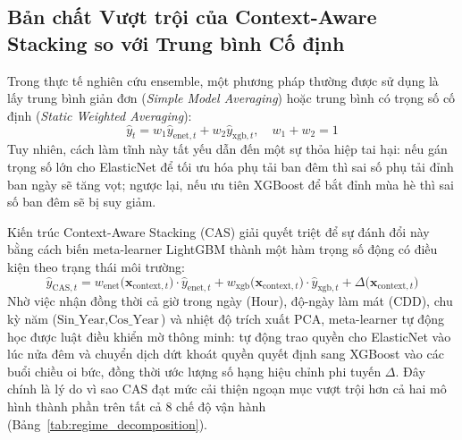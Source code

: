 \subsection{Bản chất Vượt trội của Context-Aware Stacking so với Trung bình Cố định}
Trong thực tế nghiên cứu ensemble, một phương pháp thường được sử dụng là lấy trung bình giản đơn (\textit{Simple Model Averaging}) hoặc trung bình có trọng số cố định (\textit{Static Weighted Averaging}):
\begin{equation}
    \hat{y}_t = w_1 \hat{y}_{\text{enet}, t} + w_2 \hat{y}_{\text{xgb}, t}, \quad w_1 + w_2 = 1
\end{equation}
Tuy nhiên, cách làm tĩnh này tất yếu dẫn đến một sự thỏa hiệp tai hại: nếu gán trọng số lớn cho ElasticNet để tối ưu hóa phụ tải ban đêm thì sai số phụ tải đỉnh ban ngày sẽ tăng vọt; ngược lại, nếu ưu tiên XGBoost để bắt đỉnh mùa hè thì sai số ban đêm sẽ bị suy giảm.

Kiến trúc Context-Aware Stacking (CAS) giải quyết triệt để sự đánh đổi này bằng cách biến meta-learner LightGBM thành một hàm trọng số động có điều kiện theo trạng thái môi trường:
\begin{equation}
    \hat{y}_{\text{CAS}, t} = w_{\text{enet}}\big(\mathbf{x}_{\text{context}, t}\big) \cdot \hat{y}_{\text{enet}, t} + w_{\text{xgb}}\big(\mathbf{x}_{\text{context}, t}\big) \cdot \hat{y}_{\text{xgb}, t} + \Delta\big(\mathbf{x}_{\text{context}, t}\big)
\end{equation}
Nhờ việc nhận đồng thời cả giờ trong ngày ($\text{Hour}$), độ-ngày làm mát ($\text{CDD}$), chu kỳ năm ($\text{Sin\_Year}, \text{Cos\_Year}$) và nhiệt độ trích xuất PCA, meta-learner tự động học được luật điều khiển mờ thông minh: tự động trao quyền cho ElasticNet vào lúc nửa đêm và chuyển dịch dứt khoát quyền quyết định sang XGBoost vào các buổi chiều oi bức, đồng thời ước lượng số hạng hiệu chỉnh phi tuyến $\Delta$. Đây chính là lý do vì sao CAS đạt mức cải thiện ngoạn mục vượt trội hơn cả hai mô hình thành phần trên tất cả 8 chế độ vận hành (Bảng~\ref{tab:regime_decomposition}).

